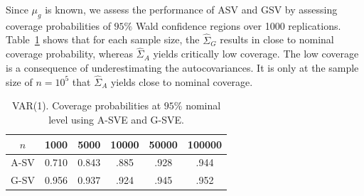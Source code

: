 \documentclass[11pt]{article}
\theoremstyle{remark}
\begin{document}
Since $\mu_g$ is known, we assess the performance of ASV and GSV by assessing coverage probabilities of $95\%$ Wald confidence regions over 1000 replications.  Table~\ref{tab:var-coverage} shows that for each sample size, the $\hat{\Sigma}_G$ results in close to nominal coverage probability, whereas $\hat{\Sigma}_A$ yields critically low coverage. The low coverage is a consequence of underestimating the autocovariances. It is only at the sample size of $n=10^5$ that $\hat{\Sigma}_A$ yields close to nominal coverage. 


\begin{table}[htbp]
    \centering
    \small
    \begin{tabular}{|c|ccccc|}
    \hline
$n$  &  1000  & 5000  & 10000  & 50000  & 100000 \\  \hline
A-SV  &    0.710 & 0.843 & .885 & .928 & .944 \\ 
G-SV  &    0.956 & 0.937 & .924 & .945 & .952 \\ \hline
    \end{tabular}
    \caption{VAR(1). Coverage probabilities at $95 \%$ nominal level using A-SVE and G-SVE.}
    \label{tab:var-coverage}
\end{table}
\end{document}
